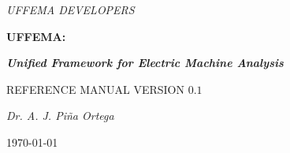 \documentclass{tufte-book} %
\newcommand{\uffemaVersion}{0.1}
\newcommand{\openepigraph}[2]{ %
\begin{fullwidth}
\sffamily\large
\begin{doublespace}
\noindent\allcaps{#1}\\ %
\noindent\allcaps{#2} %
\end{doublespace}
\end{fullwidth}
}
\begin{document}
\frontmatter

\begin{titlepage}
\begin{fullwidth}

	\centering
	{\LARGE \textit{UFFEMA DEVELOPERS} \par}
	\vspace{5cm}
	{\fontsize{40}{50}\selectfont\bfseries UFFEMA:\par}
	{\fontsize{30}{40}\selectfont\itshape\bfseries Unified Framework for Electric Machine Analysis\par}
	\vspace{2cm}
	{\LARGE\flushright  REFERENCE MANUAL VERSION $\uffemaVersion$\par}
	\vspace{7cm}
	{\Large\itshape Dr. A. J. Pi\~{n}a Ortega\par}

	\vfill

	{\large \today\par}

\end{fullwidth}
\end{titlepage}





\end{document}
